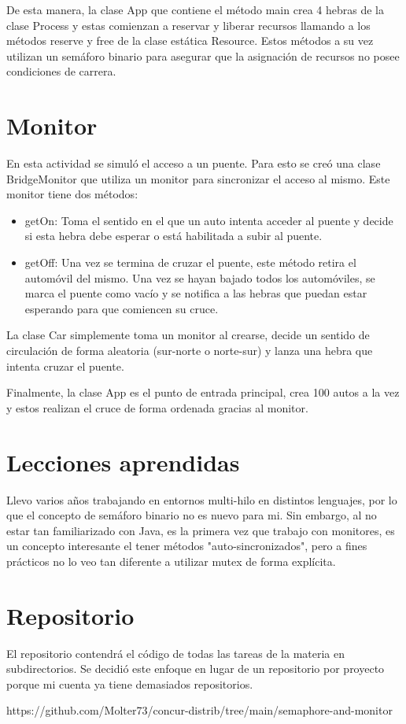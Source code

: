 \documentclass[a4paper]{article}
\begin{document}
De esta manera, la clase App que contiene el método main crea 4 hebras de la
clase Process y estas comienzan a reservar y liberar recursos llamando a los
métodos reserve y free de la clase estática Resource. Estos métodos a su vez
utilizan un semáforo binario para asegurar que la asignación de recursos no
posee condiciones de carrera.

\section{Monitor}

En esta actividad se simuló el acceso a un puente. Para esto se creó una clase
BridgeMonitor que utiliza un monitor para sincronizar el acceso al mismo. Este
monitor tiene dos métodos:

\begin{itemize}
    \item getOn: Toma el sentido en el que un auto intenta acceder al puente
        y decide si esta hebra debe esperar o está habilitada a subir al puente.
    \item getOff: Una vez se termina de cruzar el puente, este método retira
        el automóvil del mismo. Una vez se hayan bajado todos los automóviles,
        se marca el puente como vacío y se notifica a las hebras que puedan
        estar esperando para que comiencen su cruce.
\end{itemize}

La clase Car simplemente toma un monitor al crearse, decide un sentido de
circulación de forma aleatoria (sur-norte o norte-sur) y lanza una hebra que
intenta cruzar el puente.

Finalmente, la clase App es el punto de entrada principal, crea 100 autos a la
vez y estos realizan el cruce de forma ordenada gracias al monitor.

\section{Lecciones aprendidas}

Llevo varios años trabajando en entornos multi-hilo en distintos lenguajes, por
lo que el concepto de semáforo binario no es nuevo para mi. Sin embargo, al no
estar tan familiarizado con Java, es la primera vez que trabajo con monitores,
es un concepto interesante el tener métodos "auto-sincronizados", pero a fines
prácticos no lo veo tan diferente a utilizar mutex de forma explícita.

\section{Repositorio}

El repositorio contendrá el código de todas las tareas de la materia en
subdirectorios. Se decidió este enfoque en lugar de un repositorio por proyecto
porque mi cuenta ya tiene demasiados repositorios.

https://github.com/Molter73/concur-distrib/tree/main/semaphore-and-monitor
\end{document}
